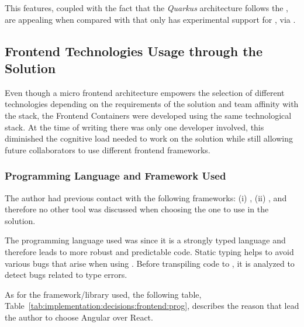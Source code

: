 This features, coupled with the fact that the \textit{Quarkus} architecture follows the , are appealing when compared with  that only has experimental support for , via .

\subsection{Frontend Technologies Usage through the Solution}
\label{subsec:implementation:decisions:frontend}

Even though a micro frontend architecture empowers the selection of different technologies depending on the requirements of the solution and team affinity with the stack, the Frontend Containers were developed using the same technological stack. At the time of writing there was only one developer involved, this diminished the cognitive load needed to work on the solution while still allowing future collaborators to use different frontend frameworks.

\subsubsection{Programming Language and Framework Used}
\label{subsubsec:implementation:decisions:frontend:prog}

The author had previous contact with the following frameworks: (i) , (ii) , and therefore no other tool was discussed when choosing the one to use in the solution.

The programming language used was  since it is a strongly typed language and therefore leads to more robust and predictable code. Static typing helps to avoid various bugs that arise when using . Before transpiling  code to , it is analyzed to detect bugs related to type errors.

As for the framework/library used, the following table, Table~\ref{tab:implementation:decisions:frontend:prog}, describes the reason that lead the author to choose Angular over React.

